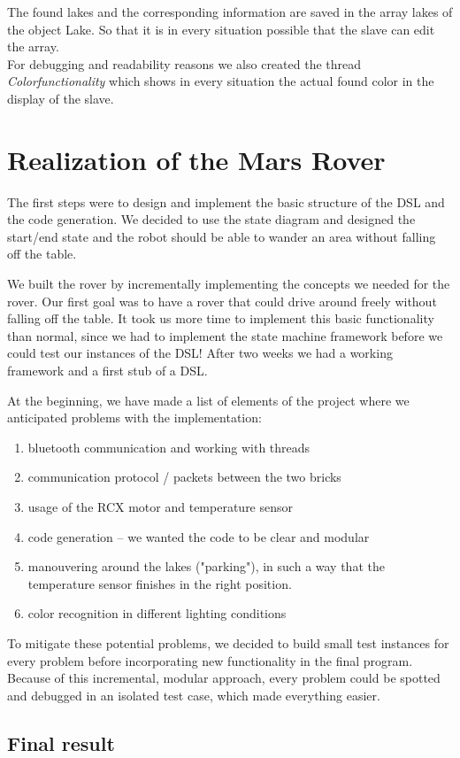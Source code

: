 \documentclass[11pt,a4paper]{article}
\begin{document}
The found lakes and the corresponding information are saved in the array lakes of the object Lake. So that it is in every situation possible that the slave can edit the array. \\

For debugging and readability reasons we also created the thread \emph{Colorfunctionality} which shows in every situation the actual found color in the display of the slave.  
  



\section*{Realization of the Mars Rover}
The first steps were to design and implement the basic structure of the DSL and the code generation. We decided to use the state diagram and designed the start/end state and the robot should be able to wander an area without falling off the table. 

We built the rover by incrementally implementing the concepts we needed for the rover. Our first goal was to have a rover that could drive around freely without falling off the table. It took us more time to implement this basic functionality than normal, since we had to implement the state machine framework before we could test our instances of the DSL!
After two weeks we had a working framework and a first stub of a DSL. 

At the beginning, we have made a list of elements of the project where we anticipated problems with the implementation: 
\begin{enumerate}
\item bluetooth communication and working with threads
\item communication protocol / packets between the two bricks
\item usage of the RCX motor and temperature sensor
\item code generation -- we wanted the code to be clear and modular
\item manouvering around the lakes ("parking"), in such a way that the temperature sensor finishes in the right position.
\item color recognition in different lighting conditions
\end{enumerate}

To mitigate these potential problems, we decided to build small test instances for every problem before incorporating new functionality in the final program. Because of this incremental, modular approach, every problem could be spotted and debugged in an isolated test case, which made everything easier. 



\subsection*{Final result}
\end{document}
